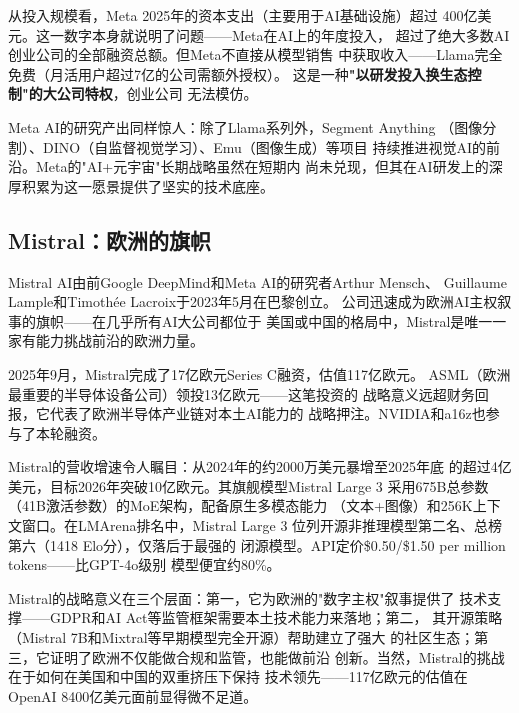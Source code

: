 从投入规模看，Meta 2025年的资本支出（主要用于AI基础设施）超过
400亿美元。这一数字本身就说明了问题——Meta在AI上的年度投入，
超过了绝大多数AI创业公司的全部融资总额。但Meta不直接从模型销售
中获取收入——Llama完全免费（月活用户超过7亿的公司需额外授权）。
这是一种\textbf{"以研发投入换生态控制"的大公司特权}，创业公司
无法模仿。

Meta AI的研究产出同样惊人：除了Llama系列外，Segment Anything
（图像分割）、DINO（自监督视觉学习）、Emu（图像生成）等项目
持续推进视觉AI的前沿。Meta的"AI+元宇宙"长期战略虽然在短期内
尚未兑现，但其在AI研发上的深厚积累为这一愿景提供了坚实的技术底座。

\subsection{Mistral：欧洲的旗帜}
\label{subsec:mistral-recap}

Mistral AI由前Google DeepMind和Meta AI的研究者Arthur Mensch、
Guillaume Lample和Timoth\'{e}e Lacroix于2023年5月在巴黎创立。
公司迅速成为欧洲AI主权叙事的旗帜——在几乎所有AI大公司都位于
美国或中国的格局中，Mistral是唯一一家有能力挑战前沿的欧洲力量。

2025年9月，Mistral完成了17亿欧元Series C融资，估值117亿欧元。
ASML（欧洲最重要的半导体设备公司）领投13亿欧元——这笔投资的
战略意义远超财务回报，它代表了欧洲半导体产业链对本土AI能力的
战略押注。NVIDIA和a16z也参与了本轮融资。

Mistral的营收增速令人瞩目：从2024年的约2000万美元暴增至2025年底
的超过4亿美元，目标2026年突破10亿欧元。其旗舰模型Mistral Large 3
采用675B总参数（41B激活参数）的MoE架构，配备原生多模态能力
（文本+图像）和256K上下文窗口。在LMArena排名中，Mistral Large 3
位列开源非推理模型第二名、总榜第六（1418 Elo分），仅落后于最强的
闭源模型。API定价\$0.50/\$1.50 per million tokens——比GPT-4o级别
模型便宜约80\%。

Mistral的战略意义在三个层面：第一，它为欧洲的"数字主权"叙事提供了
技术支撑——GDPR和AI Act等监管框架需要本土技术能力来落地；第二，
其开源策略（Mistral 7B和Mixtral等早期模型完全开源）帮助建立了强大
的社区生态；第三，它证明了欧洲不仅能做合规和监管，也能做前沿
创新。当然，Mistral的挑战在于如何在美国和中国的双重挤压下保持
技术领先——117亿欧元的估值在OpenAI 8400亿美元面前显得微不足道。

